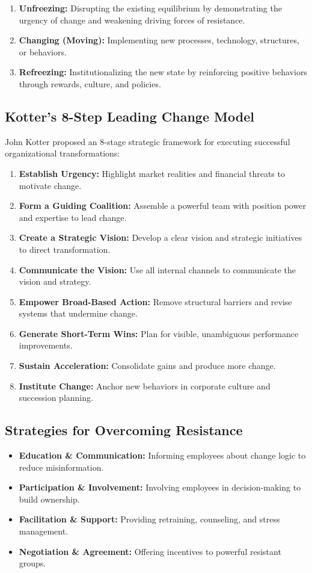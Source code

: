 \documentclass[11pt,a4paper]{article}
\begin{document}
\begin{enumerate}[leftmargin=*, itemsep=3pt]
  \item \textbf{Unfreezing:} Disrupting the existing equilibrium by demonstrating the urgency of change and weakening driving forces of resistance.
  \item \textbf{Changing (Moving):} Implementing new processes, technology, structures, or behaviors.
  \item \textbf{Refreezing:} Institutionalizing the new state by reinforcing positive behaviors through rewards, culture, and policies.
\end{enumerate}

\subsection{Kotter's 8-Step Leading Change Model}
John Kotter proposed an 8-stage strategic framework for executing successful organizational transformations:
\begin{enumerate}[leftmargin=*, itemsep=3pt]
  \item \textbf{Establish Urgency:} Highlight market realities and financial threats to motivate change.
  \item \textbf{Form a Guiding Coalition:} Assemble a powerful team with position power and expertise to lead change.
  \item \textbf{Create a Strategic Vision:} Develop a clear vision and strategic initiatives to direct transformation.
  \item \textbf{Communicate the Vision:} Use all internal channels to communicate the vision and strategy.
  \item \textbf{Empower Broad-Based Action:} Remove structural barriers and revise systems that undermine change.
  \item \textbf{Generate Short-Term Wins:} Plan for visible, unambiguous performance improvements.
  \item \textbf{Sustain Acceleration:} Consolidate gains and produce more change.
  \item \textbf{Institute Change:} Anchor new behaviors in corporate culture and succession planning.
\end{enumerate}

\subsection{Strategies for Overcoming Resistance}
\begin{itemize}[leftmargin=*, itemsep=3pt]
  \item \textbf{Education \& Communication:} Informing employees about change logic to reduce misinformation.
  \item \textbf{Participation \& Involvement:} Involving employees in decision-making to build ownership.
  \item \textbf{Facilitation \& Support:} Providing retraining, counseling, and stress management.
  \item \textbf{Negotiation \& Agreement:} Offering incentives to powerful resistant groups.
\end{itemize}
\end{document}
